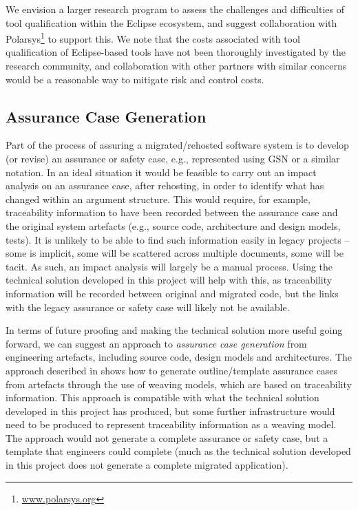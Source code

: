 \documentclass{llncs}
\begin{document}
We envision a larger research program to assess the challenges and difficulties of tool qualification within the Eclipse ecosystem, and suggest collaboration with Polarsys\footnote{\url{www.polarsys.org}} to support this. We note that the costs associated with tool qualification of Eclipse-based tools have not been thoroughly investigated by the research community, and collaboration with other partners with similar concerns would be a reasonable way to mitigate risk and control costs.

\subsection{Assurance Case Generation}
Part of the process of assuring a migrated/rehosted software system is to develop (or revise) an assurance or safety case, e.g., represented using GSN or a similar notation. In an ideal situation it would be feasible to carry out an impact analysis on an assurance case, after rehosting, in order to identify what has changed within an argument structure. This would require, for example, traceability information to have been recorded between the assurance case and the original system artefacts (e.g., source code, architecture and design models, tests). It is unlikely to be able to find such information easily in legacy projects -- some is implicit, some will be scattered across multiple documents, some will be tacit. As such, an impact analysis will largely be a manual process. Using the technical solution developed in this project will help with this, as traceability information will be recorded between original and migrated code, but the links with the legacy assurance or safety case will likely not be available.

In terms of future proofing and making the technical solution more useful going forward, we can suggest an approach to \textit{assurance case generation} from engineering artefacts, including source code, design models and architectures. The approach described in \cite{HASE15} shows how to generate outline/template assurance cases from artefacts through the use of weaving models, which are based on traceability information.  This approach is compatible with what the technical solution developed in this project has produced, but some further infrastructure would need to be produced to represent traceability information as a weaving model. The approach would not generate a complete assurance or safety case, but a template that engineers could complete (much as the technical solution developed in this project does not generate a complete migrated application). 
\end{document}
